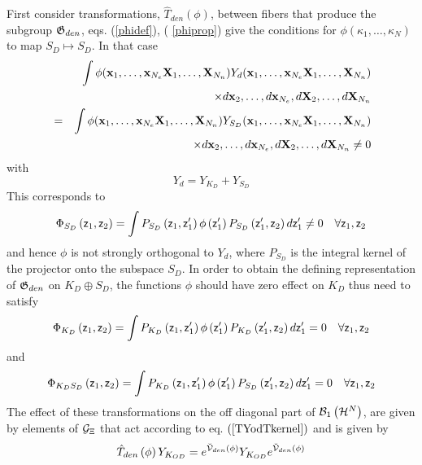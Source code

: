 First consider transformations, $\hat{T}_{den}\left( \phi \right) $, between
fibers that produce the subgroup ${\frak G}_{den}$, eqs. (\ref{phidef}), (%
\ref{phiprop}) give the conditions for $\phi (\kappa _{1},\ldots ,\kappa
_{N})$ to map $S_{D}\mapsto S_{D}$. In that case 
\begin{eqnarray}
&&\int \phi ({\bf x}_{1},\ldots ,{\bf x}_{N_{e}}{\bf X}_{1},\ldots ,{\bf X}%
_{N_{n}})Y_{d}({\bf x}_{1},\ldots ,{\bf x}_{N_{e}}{\bf X}_{1},\ldots ,{\bf X}%
_{N_{n}})  \nonumber \\
&&\qquad \qquad \qquad \qquad \times d{\bf x}_{2},\ldots ,d{\bf x}_{N_{e}},d%
{\bf X}_{2},\ldots ,d{\bf X}_{N_{n}}  \nonumber \\
&=&\int \phi ({\bf x}_{1},\ldots ,{\bf x}_{N_{e}}{\bf X}_{1},\ldots ,{\bf X}%
_{N_{n}})Y_{S_{D}}({\bf x}_{1},\ldots ,{\bf x}_{N_{e}}{\bf X}_{1},\ldots ,%
{\bf X}_{N_{n}})  \nonumber \\
&&\qquad \qquad \qquad \qquad \times d{\bf x}_{2},\ldots ,d{\bf x}_{N_{e}},d%
{\bf X}_{2},\ldots ,d{\bf X}_{N_{n}}\neq 0
\end{eqnarray}%
with%
\begin{equation}
Y_{d}=Y_{K_{D}}+Y_{S_{D}}  \label{YKdYSd}
\end{equation}%
This corresponds to 
\begin{equation}
\Phi _{S_{D}}\left( {\sf z}_{1},{\sf z}_{2}\right) =\int P_{S_{D}}\left( 
{\sf z}_{1},{\sf z}_{1}^{\prime }\right) \phi \left( {\sf z}_{1}^{\prime
}\right) P_{S_{D}}\left( {\sf z}_{1}^{\prime },{\sf z}_{2}\right) d{\sf z}%
_{1}^{\prime }\neq 0\quad \forall {\sf z}_{1},{\sf z}_{2}  \label{projS}
\end{equation}%
and hence $\phi $ is not strongly orthogonal to $Y_{d}$, where $P_{S_{D}}$
is the integral kernel of the projector onto the subspace $S_{D}$. In order
to obtain the defining representation of ${\frak G}_{den}$ on $K_{D}\oplus
S_{D}$, the functions $\phi $ should have zero effect on $K_{D}$ thus need
to satisfy 
\begin{equation}
\Phi _{K_{D}}\left( {\sf z}_{1},{\sf z}_{2}\right) =\int P_{K_{D}}\left( 
{\sf z}_{1},{\sf z}_{1}^{\prime }\right) \phi \left( {\sf z}_{1}^{\prime
}\right) P_{K_{D}}\left( {\sf z}_{1}^{\prime },{\sf z}_{2}\right) d{\sf z}%
_{1}^{\prime }=0\quad \forall {\sf z}_{1},{\sf z}_{2}  \label{projK}
\end{equation}%
and 
\begin{equation}
\Phi _{K_{D}S_{D}}\left( {\sf z}_{1},{\sf z}_{2}\right) =\int
P_{K_{D}}\left( {\sf z}_{1},{\sf z}_{1}^{\prime }\right) \phi \left( {\sf z}%
_{1}^{\prime }\right) P_{S_{D}}\left( {\sf z}_{1}^{\prime },{\sf z}%
_{2}\right) d{\sf z}_{1}^{\prime }=0\quad \forall {\sf z}_{1},{\sf z}_{2}
\label{projKS}
\end{equation}%
The effect of these transformations on the off diagonal part of ${\cal B}%
_{1}\left( {\cal H}^{N}\right) $, are given by elements of ${\cal G}_{\Xi }$
that act according to eq. $\left( \ref{TYodTkernel}\right) $ and is given by 
\begin{equation}
\hat{T}_{den}\left( \phi \right) Y_{K_{OD}}=e^{{\cal \breve{V}}_{den}\left(
\phi \right) }Y_{K_{OD}}e^{{\cal \breve{V}}_{den}\left( \phi \right) }
\end{equation}

